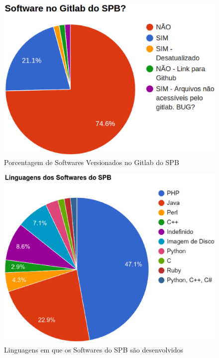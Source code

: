 \begin{figure}[!htb]
	\centering
    \includegraphics[keepaspectratio=true,scale=0.4]
    {figuras/is_software_gitlab_spb.eps}
  \caption{Porcentagem de Softwares Versionados no Gitlab do SPB}
  \label{fig:is_software_gitlab_spb}
\end{figure}

\begin{figure}[!htb]
	\centering
    \includegraphics[keepaspectratio=true,scale=0.45]
    {figuras/linguagens_softwares_spb_v2.eps}
  \caption{Linguagens em que os Softwares do SPB são desenvolvidos}
  \label{fig:linguagens_softwares_spb_v2}
\end{figure}

